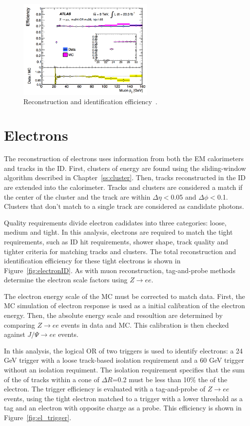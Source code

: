 \begin{figure}[hp]
\centering
\includegraphics[width=0.6\textwidth]{fig/obj/muontrigger.png}
\caption{Reconstruction and identification efficiency~\cite{Aad:2014fxa}.}
\label{fig:muontrigger}
\end{figure}

\section{Electrons}
The reconstruction of electrons uses information from both the EM calorimeters and tracks in the ID. First, clusters of energy are found using the sliding-window algorithm described in Chapter~\ref{ss:cluster}. Then, tracks reconstructed in the ID are extended into the calorimeter. Tracks and clusters are considered a match if the center of the cluster and the track are within $\Delta\eta<$0.05 and $\Delta\phi<$0.1. Clusters that don't match to a single track are considered as candidate photons. 

Quality requirements divide electron cadidates into three categories: loose, medium and tight. In this analysis, electrons are required to match the tight requirements, such as ID hit requirements, shower shape, track quality and tighter criteria for matching tracks and clusters. The total reconstruction and identification efficiency for these tight electrons is shown in Figure~\ref{fig:electronID}. As with muon reconstruction, tag-and-probe methods determine the electron scale factors using $Z\rightarrow ee$.

The electron energy scale of the MC must be corrected to match data. First, the MC simulation of electron response is used as a initial calibration of the electron energy. Then, the absolute energy scale and resoultion are determined by comparing $Z\rightarrow ee$ events in data and MC. This calibration is then checked against $J/\Psi\rightarrow ee$ events.

In this analysis, the logical OR of two triggers is used to identify electrons: a 24 GeV trigger with a loose track-based isolation requirement and a 60 GeV trigger without an isolation requiment. The isolation requirement specifies that the sum of the \pt of tracks within a cone of $\Delta R$=0.2 must be less than 10\% the \pt of the electron. The trigger efficiency is evaluated with a tag-and-probe of $Z\rightarrow ee$ events, using the tight electron matched to a trigger with a lower threshold as a tag and an electron with opposite charge as a probe. This efficiency is shown in Figure~\ref{fig:el_trigger}.


